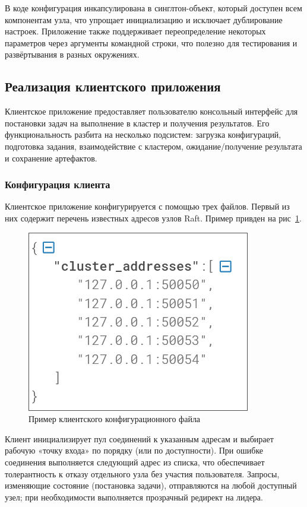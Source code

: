 В коде конфигурация инкапсулирована в синглтон-объект, который доступен всем
компонентам узла, что упрощает инициализацию и исключает дублирование настроек.
Приложение также поддерживает переопределение некоторых параметров через
аргументы командной строки, что полезно для тестирования и развёртывания в
разных окружениях.

\subsection{Реализация клиентского приложения}

Клиентское приложение предоставляет пользователю консольный интерфейс для
постановки задач на выполнение в кластер и получения результатов. Его
функциональность разбита на несколько подсистем: загрузка конфигураций,
подготовка задания, взаимодействие с кластером, ожидание/получение результата и
сохранение артефактов.

\subsubsection{Конфигурация клиента}

Клиентское приложение конфигурируется с помощью трех файлов. Первый из них
содержит перечень известных адресов узлов Raft. Пример привден на
рис~\ref{fig:client_config}.

\begin{figure}
  \centering
  \includegraphics[scale=0.4]{inc/client-config.png}
  \caption{Пример клиентского конфигурационного файла}
  \label{fig:client_config}
\end{figure}

Клиент инициализирует пул соединений к указанным адресам и выбирает рабочую
«точку входа» по порядку (или по доступности). При ошибке соединения
выполняется следующий адрес из списка, что обеспечивает толерантность к отказу
отдельного узла без участия пользователя. Запросы, изменяющие состояние
(постановка задачи), отправляются на любой доступный узел; при необходимости
выполняется прозрачный редирект на лидера.

